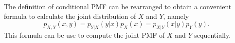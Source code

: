 %

The definition of conditional PMF can be rearranged to obtain a convenient formula to calculate the joint distribution of $X$ and $Y$, namely
\begin{equation*}
p_{X,Y} (x,y) = p_{Y|X} (y|x) p_X (x)
 = p_{X|Y} (x|y) p_Y (y) .
\end{equation*}
This formula can be use to compute the joint PMF of $X$ and $Y$ sequentially.


